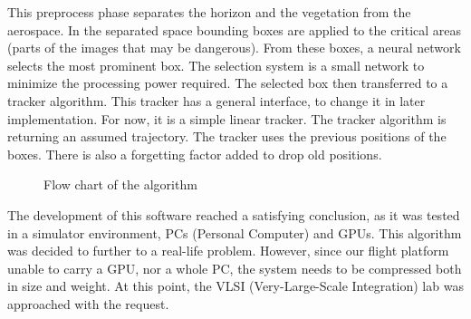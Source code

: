 This preprocess phase separates the horizon and the vegetation from the aerospace.
In the separated space bounding boxes are applied to the critical areas (parts of the images that may be dangerous).
From these boxes, a neural network selects the most prominent box.
The selection system is a small network to minimize the processing power required.
The selected box then transferred to a tracker algorithm.
This tracker has a general interface, to change it in later implementation.
For now, it is a simple linear tracker.
The tracker algorithm is returning an assumed trajectory.
The tracker uses the previous positions of the boxes. 
There is also a forgetting factor added to drop old positions.

\begin{figure}
    \centering
{}
\caption{Flow chart of the algorithm}
\label{fig:Algorithm}
\end{figure}

The development of this software reached a satisfying conclusion, as it was tested in a simulator environment, PCs (Personal Computer) and GPUs.
This algorithm was decided to further to a real-life problem.
However, since our flight platform unable to carry a GPU, nor a whole PC, the system needs to be compressed both in size and weight.
At this point, the VLSI (Very-Large-Scale Integration) lab was approached with the request.

